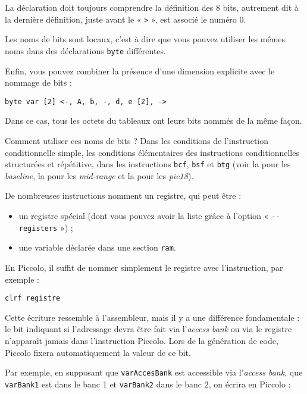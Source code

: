 La déclaration doit toujours comprendre la définition des 8 bits, autrement dit à la dernière définition, juste avant le « \texttt{>} », est associé le numéro 0.

Les noms de bits sont locaux, c'est à dire que vous pouvez utiliser les mêmes noms dans des déclarations \texttt{byte} différentes.

Enfin, vous pouvez combiner la présence d'une dimension explicite avec le nommage de bits :

\begin{lstlisting}[language=piccolo]
byte var [2] <-, A, b, -, d, e [2], ->
\end{lstlisting}

Dans ce cas, tous les octets du tableaux ont leurs bits nommés de la même façon.

Comment utiliser ces noms de bits ? Dans les conditions de l'instruction conditionnelle simple, les conditions élémentaires des instructions conditionnelles structurées et répétitive, dans les instructions \texttt{bcf}, \texttt{bsf} et \texttt{btg} (voir la  pour les \emph{baseline}, la  pour les \emph{mid-range} et la  pour les \emph{pic18}). 



De nombreuses instructions nomment un registre, qui peut être :
\begin{itemize}
  \item un registre spécial (dont vous pouvez avoir la liste grâce à l'option « \texttt{-{}-registers} ») ;
  \item une variable déclarée dans une section \texttt{ram}.
\end{itemize}

En Piccolo, il suffit de nommer simplement le registre avec l'instruction, par exemple :
\begin{lstlisting}[language=piccolo]
clrf registre
\end{lstlisting}

Cette écriture ressemble à l'assembleur, mais il y a une différence fondamentale : le bit indiquant si l'adressage devra être fait via l'\emph{access bank} ou via le registre  n'apparaît jamais dans l'instruction Piccolo. Lors de la génération de code, Piccolo fixera automatiquement la valeur de ce bit.

Par exemple, en supposant que \texttt{varAccesBank} est accessible via l'\emph{access bank}, que \texttt{varBank1} est dans le banc 1 et \texttt{varBank2} dans le banc 2, on écrira en Piccolo :


